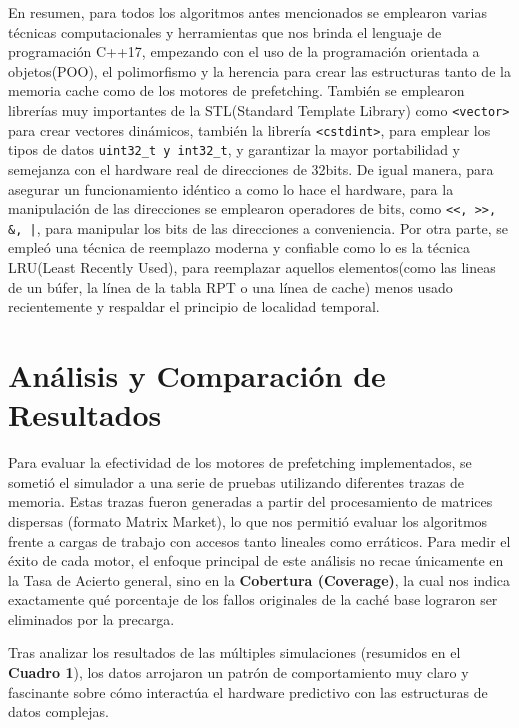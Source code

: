 \documentclass[12pt, a4paper]{article}
\begin{document}
En resumen, para todos los algoritmos antes mencionados se emplearon varias técnicas computacionales y herramientas que nos brinda el lenguaje de programación C++17, empezando con el uso de la programación orientada a objetos(POO), el polimorfismo y la herencia para crear las estructuras tanto de la memoria cache como de los motores de prefetching. También se emplearon librerías muy importantes de la STL(Standard Template Library) como \lstinline|<vector>| para crear vectores dinámicos, también la librería \lstinline|<cstdint>|, para emplear los tipos de datos \lstinline|uint32_t y int32_t|, y garantizar la mayor portabilidad y semejanza con el hardware real de direcciones de 32bits. De igual manera, para asegurar un funcionamiento idéntico a como lo hace el hardware, para la manipulación de las direcciones se emplearon operadores de bits, como \lstinline!<<, >>, &, |!, para manipular los bits de las direcciones a conveniencia. Por otra parte, se empleó una técnica de reemplazo moderna y confiable como lo es la técnica LRU(Least Recently Used), para reemplazar aquellos elementos(como las lineas de un búfer, la línea de la tabla RPT o una línea de cache) menos usado recientemente y respaldar el principio de localidad temporal.
\newpage
\section{Análisis y Comparación de Resultados}
Para evaluar la efectividad de los motores de prefetching implementados, se sometió el simulador a una serie de pruebas utilizando diferentes trazas de memoria. Estas trazas fueron generadas a partir del procesamiento de matrices dispersas (formato Matrix Market), lo que nos permitió evaluar los algoritmos frente a cargas de trabajo con accesos tanto lineales como erráticos. Para medir el éxito de cada motor, el enfoque principal de este análisis no recae únicamente en la Tasa de Acierto general, sino en la \textbf{Cobertura (Coverage)}, la cual nos indica exactamente qué porcentaje de los fallos originales de la caché base lograron ser eliminados por la precarga.

Tras analizar los resultados de las múltiples simulaciones (resumidos en el \textbf{Cuadro 1}), los datos arrojaron un patrón de comportamiento muy claro y fascinante sobre cómo interactúa el hardware predictivo con las estructuras de datos complejas.
\end{document}
